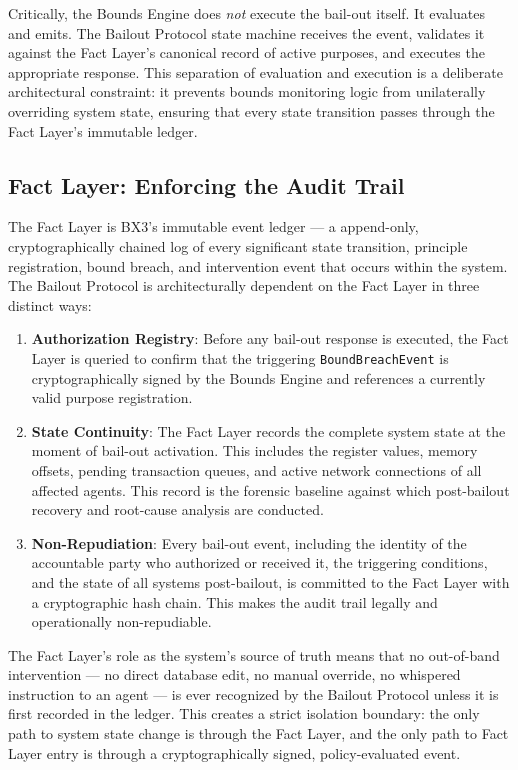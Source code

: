 Critically, the Bounds Engine does \textit{not} execute the bail-out itself. It evaluates and emits. The Bailout Protocol state machine receives the event, validates it against the Fact Layer's canonical record of active purposes, and executes the appropriate response. This separation of evaluation and execution is a deliberate architectural constraint: it prevents bounds monitoring logic from unilaterally overriding system state, ensuring that every state transition passes through the Fact Layer's immutable ledger.

\subsection{Fact Layer: Enforcing the Audit Trail}
\label{sec:fact-layer-audit-trail}

The Fact Layer is BX3's immutable event ledger — a append-only, cryptographically chained log of every significant state transition, principle registration, bound breach, and intervention event that occurs within the system. The Bailout Protocol is architecturally dependent on the Fact Layer in three distinct ways:

\begin{enumerate}
    \item \textbf{Authorization Registry}: Before any bail-out response is executed, the Fact Layer is queried to confirm that the triggering \texttt{BoundBreachEvent} is cryptographically signed by the Bounds Engine and references a currently valid purpose registration.
    \item \textbf{State Continuity}: The Fact Layer records the complete system state at the moment of bail-out activation. This includes the register values, memory offsets, pending transaction queues, and active network connections of all affected agents. This record is the forensic baseline against which post-bailout recovery and root-cause analysis are conducted.
    \item \textbf{Non-Repudiation}: Every bail-out event, including the identity of the accountable party who authorized or received it, the triggering conditions, and the state of all systems post-bailout, is committed to the Fact Layer with a cryptographic hash chain. This makes the audit trail legally and operationally non-repudiable.
\end{enumerate}

The Fact Layer's role as the system's source of truth means that no out-of-band intervention — no direct database edit, no manual override, no whispered instruction to an agent — is ever recognized by the Bailout Protocol unless it is first recorded in the ledger. This creates a strict isolation boundary: the only path to system state change is through the Fact Layer, and the only path to Fact Layer entry is through a cryptographically signed, policy-evaluated event.

